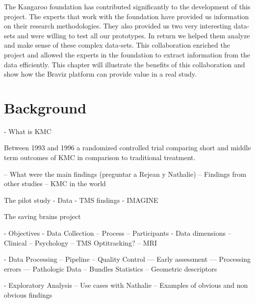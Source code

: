\label{chap_kmc400}

The Kangaroo foundation has contributed significantly to the development of this project. The experts that work with the foundation have provided us information on their research methodologies. They also provided us two very interesting data-sets and were willing to test all our prototypes. In return we helped them analyze and make sense of these complex data-sets. This collaboration enriched the project and allowed the experts in the foundation to extract information from the data efficiently. This chapter will illustrate the benefits of this collaboration and show how the Braviz platform can provide value in a real study. 

\section{Background}


- What is KMC

Between 1993 and 1996 a randomized controlled trial comparing short and middle term outcomes of KMC in comparison to traditional treatment.


-- What were the main findings
(preguntar a Rejean y Nathalie)
-- Findings from other studies
-- KMC in the world


The pilot study
 - Data
 - TMS findings
 - IMAGINE


The saving brains project

 - Objectives
 - Data Collection
 -- Process
 -- Participants
 - Data dimensions
 -- Clinical
 -- Psychology
 -- TMS Optitracking?
 -- MRI
 
 - Data Processing
 -- Pipeline
 -- Quality Control
 --- Early assessment
 --- Processing errors
 --- Pathologic Data
 -- Bundles Statistics
 -- Geometric descriptors

 - Exploratory Analysis
 -- Use cases with Nathalie
 -- Examples of obvious and non obvious findings



